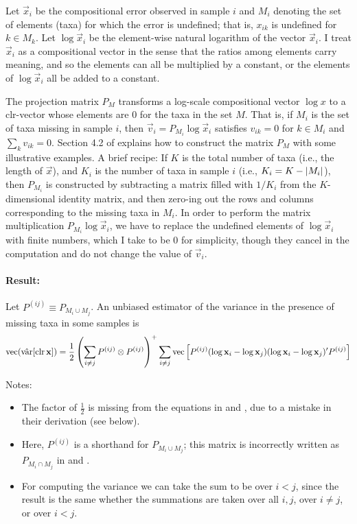 Let $\vec x_i$ be the compositional error observed in sample $i$ and $M_i$
denoting the set of elements (taxa) for which the error is undefined; that is,
$x_{ik}$ is undefined for $k \in M_k$. Let $\log \vec x_i$ be the element-wise
natural logarithm of the vector $\vec x_i$. I treat $\vec x_i$ as a
compositional vector in the sense that the ratios among elements carry meaning,
and so the elements can all be multiplied by a constant, or the elements of
$\log \vec x_i$ all be added to a constant. 

The projection matrix $P_{M}$ transforms a log-scale compositional vector $\log
x$ to a clr-vector whose elements are 0 for the taxa in the set $M$. That is,
if $M_i$ is the set of taxa missing in sample $i$, then $\vec v_i = P_{M_i}
\log \vec x_i$ satisfies $v_{ik} = 0$ for $k \in M_i$ and $\sum_k v_{ik} = 0$.
Section 4.2 of \textcite{Bren2008} explains how to construct the matrix $P_{M}$
with some illustrative examples. A brief recipe: If $K$ is the total number of
taxa (i.e., the length of $\vec x$), and $K_i$ is the number of taxa in sample
$i$ (i.e., $K_i = K - \lvert M_i\rvert$), then $P_{M_i}$ is constructed by subtracting
a matrix filled with $1/K_i$ from the $K$-dimensional identity matrix, and then
zero-ing out the rows and columns corresponding to the missing taxa in $M_i$.
In order to perform the matrix multiplication $P_{M_i} \log \vec x_i$, we have
to replace the undefined elements of $\log \vec x_i$ with finite numbers, which
I take to be 0 for simplicity, though they cancel in the computation and do not
change the value of $\vec v_i$.

\paragraph{Result:}

Let $P^{(ij)} \equiv P_{M_i \cup M_j}$. An unbiased estimator of the variance
in the presence of missing taxa in some samples is
\begin{align} 
  \label{eq:variance}
  \operatorname{vec} (\hat{\operatorname{var}}[\operatorname{clr} \mathbf{x}])
  = \frac{1}{2} \left(\sum_{i\ne j} P^{(ij)} \otimes P^{(ij)} \right)^{+}
    \sum_{i\ne j} \operatorname{vec}\left[ P^{(ij)} (\log \mathbf{x}_i - \log \mathbf{x}_j) 
      (\log \mathbf{x}_i - \log \mathbf{x}_j)' P^{(ij)} \right]
\end{align}

Notes:
\begin{itemize}
  \item The factor of $\tfrac{1}{2}$ is missing from the equations in
    \textcite{vandenBoogaart2006} and \textcite{Bren2008}, due to a mistake in
    their derivation (see below).
  \item Here, $P^{(ij)}$ is a shorthand for $P_{M_i \cup M_j}$; this matrix is
    incorrectly written as $P_{M_i \cap M_j}$ in
    \textcite{vandenBoogaart2006} and \textcite{Bren2008}.
  \item For computing the variance we can take the sum to be over $i<j$, since
    the result is the same whether the summations are taken over all $i,j$,
    over $i\ne j$, or over $i < j$.
\end{itemize}


